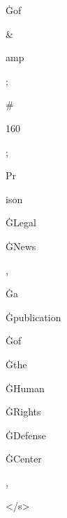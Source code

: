 \documentclass[varwidth]{standalone}
\begin{document}
\begin{CJK*}{UTF8}{gbsn}
{{{\colorbox{red!0.0819659}{\strut Ġof} \colorbox{red!0.065680556}{\strut \&} \colorbox{red!0.01182716}{\strut amp} \colorbox{red!0.019497622}{\strut ;} \colorbox{red!0.007211915}{\strut \#} \colorbox{red!0.006629066}{\strut 160} \colorbox{red!0.10685215}{\strut ;} \colorbox{red!0.114240125}{\strut Pr} \colorbox{red!0.2758912}{\strut ison} \colorbox{red!0.34024683}{\strut ĠLegal} \colorbox{red!0.6476047}{\strut ĠNews} \colorbox{red!0.2507124}{\strut ,} \colorbox{red!0.27209336}{\strut Ġa} \colorbox{red!0.44561368}{\strut Ġpublication} \colorbox{red!0.39367163}{\strut Ġof} \colorbox{red!0.63483715}{\strut Ġthe} \colorbox{red!0.29045856}{\strut ĠHuman} \colorbox{red!0.24071296}{\strut ĠRights} \colorbox{red!1.3737925}{\strut ĠDefense} \colorbox{red!2.8130965}{\strut ĠCenter} \colorbox{red!0.43881577}{\strut ,} \colorbox{red!0.10000581}{\strut </s>} 
}}}
\end{CJK*}
\end{document}
